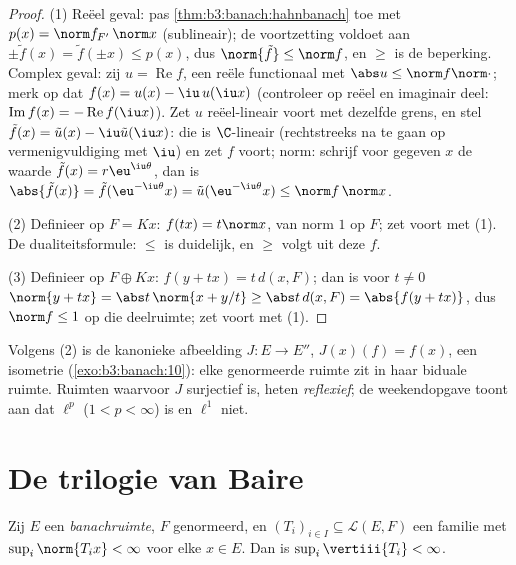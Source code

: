 \begin{proof}
(1) Reëel geval: pas \cref{thm:b3:banach:hahnbanach} toe met
$p(x) = \norm f_{F'}\,\norm x$ (sublineair); de voortzetting
voldoet aan $\pm\tilde f(x) = \tilde f(\pm x) \leq p(x)$, dus
$\norm{\tilde f} \leq \norm f$, en $\geq$ is de beperking.
Complex geval: zij $u = \operatorname{Re}f$, een reële
functionaal met $\abs u \leq \norm f\norm\cdot$; merk op dat $f(x)
= u(x) - \iu\,u(\iu x)$ (controleer op reëel en imaginair deel:
$\operatorname{Im}f(x) = -\operatorname{Re}f(\iu x)$). Zet $u$
reëel-lineair voort met dezelfde grens, en stel $\tilde f(x) =
\tilde u(x) - \iu\tilde u(\iu x)$: die is $\C$-lineair
(rechtstreeks na te gaan op vermenigvuldiging met $\iu$) en zet
$f$ voort; norm: schrijf voor gegeven $x$ de waarde $\tilde f(x) =
r\eu^{\iu\theta}$, dan is $\abs{\tilde f(x)} = \tilde
f(\eu^{-\iu\theta}x) = \tilde u(\eu^{-\iu\theta}x) \leq \norm
f\,\norm x$.

(2) Definieer op $F = Kx$: $f(tx) = t\norm x$, van norm $1$ op
$F$; zet voort met (1). De dualiteitsformule: $\leq$ is duidelijk,
en $\geq$ volgt uit deze $f$.

(3) Definieer op $F \oplus Kx$: $f(y + tx) = t\,d(x, F)$; dan is
voor $t \neq 0$ $\norm{y + tx} = \abs t\,\norm{x + y/t} \geq \abs
t\,d(x, F) = \abs{f(y + tx)}$, dus $\norm f \leq 1$ op die
deelruimte; zet voort met (1).
\end{proof}

\begin{remark}\label{rem:b3:banach:bidual}
Volgens (2) is de kanonieke afbeelding $J \colon E \to E''$,
$J(x)(f) = f(x)$, een isometrie (\cref{exo:b3:banach:10}): elke
genormeerde ruimte zit in haar biduale ruimte. Ruimten waarvoor
$J$ surjectief is, heten
\emph{reflexief}; de weekendopgave toont
aan dat $\ell^p$ ($1 < p < \infty$)  is en $\ell^1$
niet.
\end{remark}

\section{De trilogie van Baire}

\begin{theorem}
\label{thm:b3:banach:banachsteinhaus}
Zij $E$ een \emph{banachruimte}, $F$ genormeerd, en
$(T_i)_{i\in I} \subseteq \mathcal L(E, F)$ een familie met
$\sup_i \norm{T_ix} < \infty$ voor elke $x \in E$. Dan is $\sup_i
\vertiii{T_i} < \infty$.
\end{theorem}


